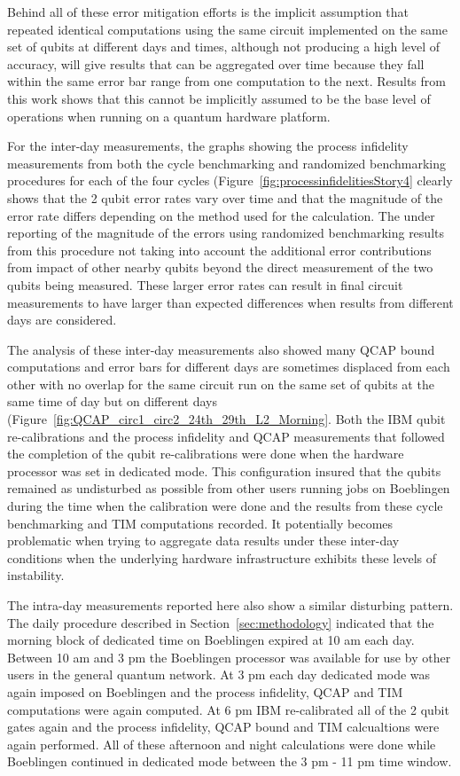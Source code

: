 Behind all of these error mitigation efforts is the implicit assumption that repeated identical computations using the same circuit implemented on the same set of qubits at different days and times, although not producing a high level of accuracy, will give results that can be aggregated over time because they fall within the same error bar range from one computation to the next.  Results from this work shows that this cannot be implicitly assumed to be the base level of operations when running on a quantum hardware platform.  

For the inter-day measurements, the graphs showing the process infidelity measurements from both the cycle benchmarking and randomized benchmarking procedures for each of the four cycles  (Figure~\ref{fig:processinfidelitiesStory4} clearly shows that the 2 qubit error rates vary over time and that the magnitude of the error rate differs depending on the method used for the calculation.  The under reporting of the magnitude of the errors using randomized benchmarking results from this procedure not taking into account the additional error contributions from impact of other nearby qubits beyond the direct measurement of the two qubits being measured.  These larger error rates can result in final circuit measurements to have larger than expected differences when results from different days are considered.

The analysis of these inter-day measurements also showed many QCAP bound computations and error bars for different days are sometimes displaced from each other with no overlap for the same circuit run on the same set of qubits at the same time of day but on different days (Figure~\ref{fig:QCAP_circ1_circ2_24th_29th_L2_Morning}.  Both the IBM qubit re-calibrations and the process infidelity and QCAP measurements that followed the completion of the qubit re-calibrations were done when the hardware processor was set in dedicated mode.  This configuration insured that the qubits remained as undisturbed as possible from other users running jobs on Boeblingen during the time when the calibration were done and the results from these cycle benchmarking and TIM computations recorded.  It potentially becomes problematic when trying to aggregate data results under these inter-day conditions when the underlying hardware infrastructure exhibits these levels of instability.

The intra-day measurements reported here also show a similar disturbing pattern.  The daily procedure described in Section~\ref{sec:methodology} indicated that the morning block of dedicated time on Boeblingen expired at 10 am each day. Between 10  am and 3 pm the Boeblingen processor was available for use by other users in the general quantum network.  At 3 pm each day dedicated mode was again imposed on Boeblingen and the process infidelity, QCAP and TIM computations were again computed.  At 6 pm IBM re-calibrated all of the 2 qubit gates again and the process infidelity, QCAP bound and TIM calcualtions were again performed.  All of these afternoon and night calculations were done while Boeblingen continued in dedicated mode between the 3 pm - 11 pm time window.

